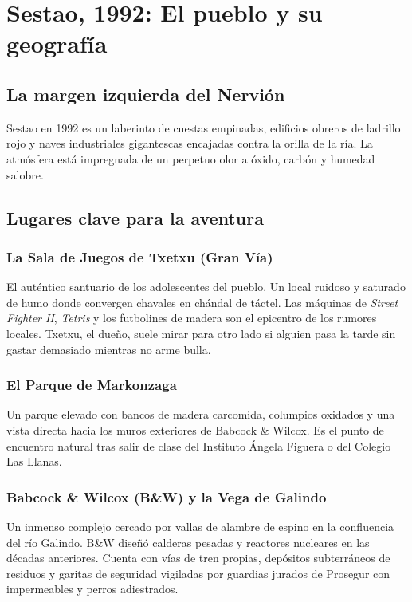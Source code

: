 \chapter{Sestao, 1992: El pueblo y su geografía}

\section{La margen izquierda del Nervión}

Sestao en 1992 es un laberinto de cuestas empinadas, edificios obreros de ladrillo rojo y naves industriales gigantescas encajadas contra la orilla de la ría. La atmósfera está impregnada de un perpetuo olor a óxido, carbón y humedad salobre.


\section{Lugares clave para la aventura}

\subsection{La Sala de Juegos de Txetxu (Gran Vía)}
El auténtico santuario de los adolescentes del pueblo. Un local ruidoso y saturado de humo donde convergen chavales en chándal de táctel. Las máquinas de \emph{Street Fighter II}, \emph{Tetris} y los futbolines de madera son el epicentro de los rumores locales. Txetxu, el dueño, suele mirar para otro lado si alguien pasa la tarde sin gastar demasiado mientras no arme bulla.

\subsection{El Parque de Markonzaga}
Un parque elevado con bancos de madera carcomida, columpios oxidados y una vista directa hacia los muros exteriores de Babcock \& Wilcox. Es el punto de encuentro natural tras salir de clase del Instituto Ángela Figuera o del Colegio Las Llanas.

\subsection{Babcock \& Wilcox (B\&W) y la Vega de Galindo}
Un inmenso complejo cercado por vallas de alambre de espino en la confluencia del río Galindo. B\&W diseñó calderas pesadas y reactores nucleares en las décadas anteriores. Cuenta con vías de tren propias, depósitos subterráneos de residuos y garitas de seguridad vigiladas por guardias jurados de Prosegur con impermeables y perros adiestrados.

